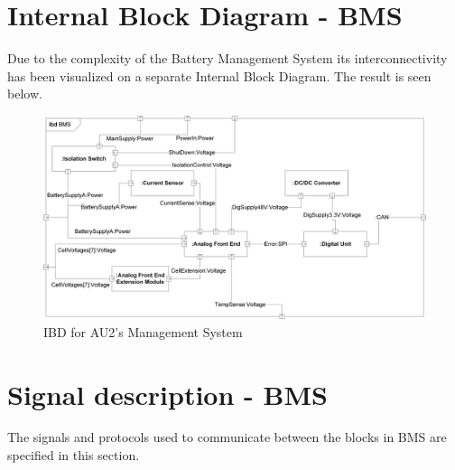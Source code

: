 \section{Internal Block Diagram - BMS}
Due to the complexity of the Battery Management System its interconnectivity has been visualized on a separate Internal Block Diagram. The result is seen below.

\begin{figure}[H]
	\centering
	\includegraphics[width=1\linewidth]{Architecture/Diagrams/IBD_BMS}
	\caption{IBD for AU2's Management System}
	\label{fig:IBD_BMS}
\end{figure}

\section{Signal description - BMS}
The signals and protocols used to communicate between the blocks in BMS are specified in this section.

